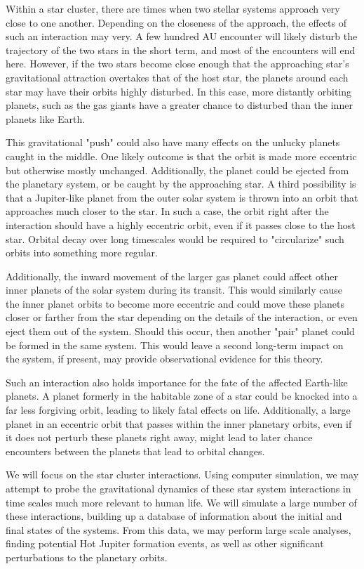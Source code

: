 \documentclass[12pt]{article}
\begin{document}
Within a star cluster, there are times when two stellar systems approach very close
to one another. Depending on the closeness of the approach, the effects of such
an interaction may very. A few hundred AU encounter will likely disturb the trajectory
of the two stars in the short term, and most of the encounters will end here. However,
if the two stars become close enough that the approaching star's gravitational attraction
overtakes that of the host star, the planets around each star may have their orbits
highly disturbed. In this case, more distantly orbiting planets, such as the gas giants
have a greater chance to disturbed than the inner planets like Earth.

This gravitational "push" could also have many effects on the unlucky planets caught in the
middle. One likely outcome is that the orbit is made more eccentric but otherwise
mostly unchanged. Additionally, the planet could be ejected from the planetary system,
or be caught by the approaching star. A third possibility is that a Jupiter-like planet
from the outer solar system is thrown into an orbit that approaches much closer to the
star. In such a case, the orbit right after the interaction should have a highly
eccentric orbit, even if it passes close to the host star. Orbital decay over long
timescales would be required to "circularize" such orbits into something more regular.

Additionally, the inward movement of the larger gas planet could affect other
inner planets of the solar system during its transit. This would similarly 
cause the inner planet orbits to become more eccentric and could move
these planets closer or farther from the star depending on the details of the
interaction, or even eject them out of the system. Should this occur,
then another "pair" planet could be formed in the same system. This would leave
a second long-term impact on the system, if present, may provide observational
evidence for this theory.

Such an interaction also holds importance for the fate of the affected Earth-like planets.
A planet formerly in the habitable zone of a star could be knocked into a far less
forgiving orbit, leading to likely fatal effects on life. Additionally, a
large planet in an eccentric orbit that passes within the inner planetary orbits,
even if it does not perturb these planets right away, might lead to later chance
encounters between the planets that lead to orbital changes.

We will focus on the star cluster interactions. Using computer simulation,
we may attempt to probe the gravitational dynamics of these star system 
interactions in time scales much more relevant to human life. We will simulate
a large number of these interactions, building up a database of information about
the initial and final states of the systems. From this data, we may perform large
scale analyses, finding potential Hot Jupiter formation events, as well as other
significant perturbations to the planetary orbits.
\end{document}

